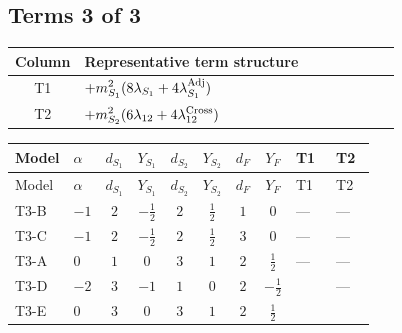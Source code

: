 \documentclass[8pt]{article}
\begin{document}
\begin{landscape}
\subsection*{Terms 3 of 3}
\begin{center}
\begin{tabular}{@{}c >{\raggedright\arraybackslash}p{0.82\linewidth}@{}}
\toprule
Column & Representative term structure \\
\midrule
T1 & \(\displaystyle +{m_{S_1}^2} (8 {\lambda_{S_1}}+4 {\lambda_{S_1}^{\rm Adj}})\) \\
\midrule
T2 & \(\displaystyle +{m_{S_2}^2} (6 {\lambda_{12}}+4 {\lambda_{12}^{\rm Cross}})\) \\
\midrule
\bottomrule
\end{tabular}
\end{center}
\smallskip
\tiny
\begin{longtable}{@{}llcccccc >{\raggedright\arraybackslash}p{0.21\linewidth} >{\raggedright\arraybackslash}p{0.21\linewidth}@{}}
\toprule
Model & $\alpha$ & $d_{S_1}$ & $Y_{S_1}$ & $d_{S_2}$ & $Y_{S_2}$ & $d_F$ & $Y_F$ & T1 & T2 \\
\midrule
\endfirsthead
\toprule
Model & $\alpha$ & $d_{S_1}$ & $Y_{S_1}$ & $d_{S_2}$ & $Y_{S_2}$ & $d_F$ & $Y_F$ & T1 & T2 \\
\midrule
\endhead
T3-B & $-1$ & $2$ & $-\frac{1}{2}$ & $2$ & $\frac{1}{2}$ & $1$ & $0$ & --- & --- \\
\midrule
T3-C & $-1$ & $2$ & $-\frac{1}{2}$ & $2$ & $\frac{1}{2}$ & $3$ & $0$ & --- & --- \\
\midrule
T3-A & $0$ & $1$ & $0$ & $3$ & $1$ & $2$ & $\frac{1}{2}$ & --- & --- \\
\midrule
T3-D & $-2$ & $3$ & $-1$ & $1$ & $0$ & $2$ & $-\frac{1}{2}$ & \scriptsize\adjustbox{max width=\linewidth}{$\begin{gathered} +{m_{S_1}^2} (8 {\lambda_{S_1}}+4 {\lambda_{S_1}^{\rm Adj}})\end{gathered}$} & --- \\
\midrule
T3-E & $0$ & $3$ & $0$ & $3$ & $1$ & $2$ & $\frac{1}{2}$ & \scriptsize\adjustbox{max width=\linewidth}{$\begin{gathered} +{m_{S_1}^2} (8 {\lambda_{S_1}}+4 {\lambda_{S_1}^{\rm Adj}})\end{gathered}$} & \scriptsize\adjustbox{max width=\linewidth}{$\begin{gathered} +{m_{S_2}^2} (6 {\lambda_{12}}+4 {\lambda_{12}^{\rm Cross}})\end{gathered}$} \\
\midrule
\bottomrule
\end{longtable}
\clearpage

\end{landscape}
\end{document}
